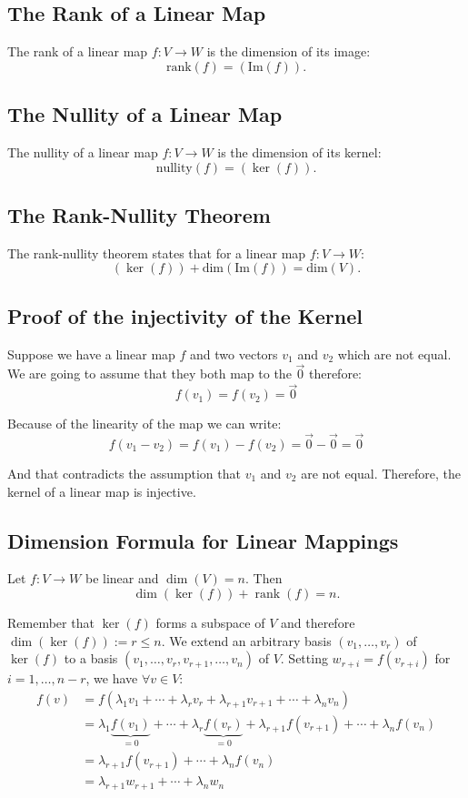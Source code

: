 \subsection{The Rank of a Linear Map}
The rank of a linear map \( f: V \to W \) is the dimension of its image:
    \[
    \text{rank}(f) = (\text{Im}(f)).
    \]
\subsection{The Nullity of a Linear Map}
The nullity of a linear map \( f: V \to W \) is the dimension of its kernel:
    \[
    \text{nullity}(f) = (\ker(f)).
    \]
\subsection{The Rank-Nullity Theorem}
The rank-nullity theorem states that for a linear map \( f: V \to W \):
\[
\text{}(\ker(f)) + \text{dim}(\text{Im}(f)) = \text{dim}(V).
\]

\subsection{Proof of the injectivity of the Kernel}

Suppose we have a linear map \(f\) and two vectors \(v_1\) and \(v_2\) which are not equal.
 We are going to assume that they both map to the \(\vec{0}\) therefore:
\[
f(v_1) = f(v_2) = \vec{0}
\]

 Because of the linearity of the map we can write:
\[
f(v_1 - v_2) = f(v_1) - f(v_2) = \vec{0} - \vec{0} = \vec{0}
\]

 And that contradicts the assumption that \(v_1\) and 
 \(v_2\) are not equal. Therefore, the kernel of a linear map is injective.

\subsection{Dimension Formula for Linear Mappings}
    Let \(f: V \to W\) be linear and \(\dim(V) = n\). Then
    \[\dim(\ker(f)) + \operatorname{rank}(f) = n.\]
    
    
    Remember that \(\ker(f)\) forms a subspace of \(V\) and therefore \(\dim(\ker(f)) := r \leq n\). We extend an arbitrary basis \((v_1, \ldots, v_r)\) of \(\ker(f)\) to a basis \((v_1, \ldots, v_r, v_{r+1}, \ldots, v_n)\) of \(V\). Setting \(w_{r+i} = f(v_{r+i})\) for \(i = 1, \ldots, n - r\), we have \(\forall v \in V\):
    \begin{align*}
    f(v) &= f(\lambda_1v_1 + \cdots + \lambda_r v_r + \lambda_{r+1}v_{r+1} + \cdots + \lambda_n v_n) \\
    &= \lambda_1 \underbrace{f(v_1)}_{=0} + \cdots + \lambda_r \underbrace{f(v_r)}_{=0} + \lambda_{r+1} f(v_{r+1}) + \cdots + \lambda_n f(v_n) \\
    &= \lambda_{r+1} f(v_{r+1}) + \cdots + \lambda_n f(v_n) \\
    &= \lambda_{r+1}w_{r+1} + \cdots + \lambda_n w_n
    \end{align*}
    
